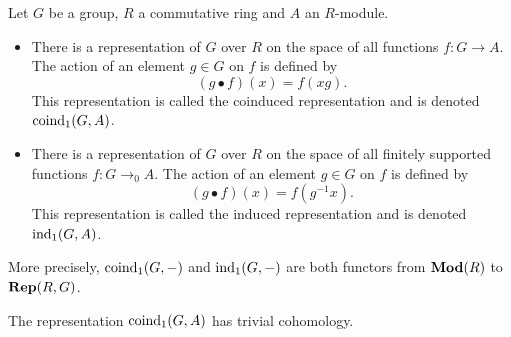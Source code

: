 \begin{definition}\label{def:induced}
	\leanok
	Let $G$ be a group, $R$ a commutative ring and $A$ an $R$-module.
	\begin{itemize}
		\item
		There is a representation of $G$ over $R$
		on the space of all functions $f : G \to A$. The action of an element $g \in G$ on $f$
		is defined by
		\[
			(g \bullet f) (x) = f(xg).
		\]
		This representation is called the coinduced representation and is denoted $\mathrm{coind}_1(G,A)$.
		\item
		There is a representation of $G$ over $R$
		on the space of all finitely supported functions $f : G \to_0 A$.
		The action of an element $g \in G$ on $f$ is defined by
		\[
			(g \bullet f) (x) = f(g^{-1}x).
		\]
		This representation is called the induced representation and is denoted $\mathrm{ind}_1(G,A)$.
	\end{itemize}
	More precisely, $\mathrm{coind}_1(G,-)$ and $\mathrm{ind}_1(G,-)$ are both functors from $\mathbf{Mod}(R)$ to $\mathbf{Rep}(R,G)$.
\end{definition}

\begin{lemma}	\label{lem:coind₁ trivial cohomology}
	\leanok
	The representation $\mathrm{coind}_1(G,A)$ has trivial cohomology.
\end{lemma}


